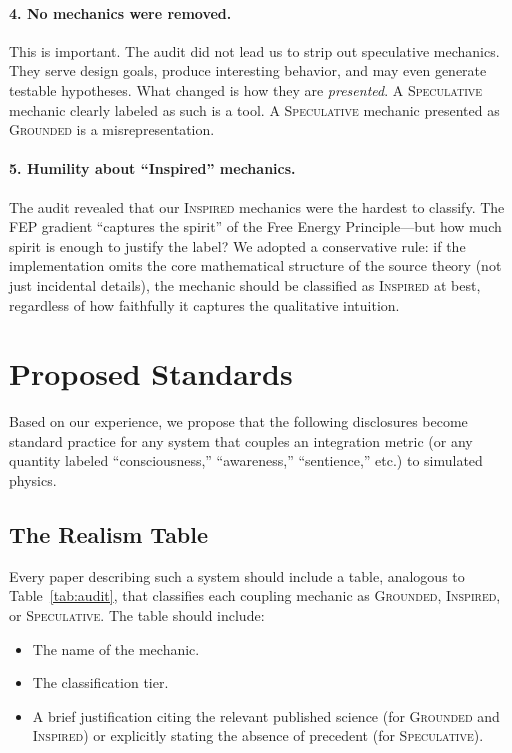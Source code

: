 \documentclass[12pt,a4paper]{article}
\begin{document}
\paragraph{4. No mechanics were removed.}
This is important.  The audit did not lead us to strip out
speculative mechanics.  They serve design goals, produce
interesting behavior, and may even generate testable hypotheses.
What changed is how they are \emph{presented}.  A
\textsc{Speculative} mechanic clearly labeled as such is a tool.
A \textsc{Speculative} mechanic presented as \textsc{Grounded}
is a misrepresentation.

\paragraph{5. Humility about ``Inspired'' mechanics.}
The audit revealed that our \textsc{Inspired} mechanics were
the hardest to classify.  The FEP gradient ``captures the
spirit'' of the Free Energy Principle---but how much spirit is
enough to justify the label?  We adopted a conservative rule:
if the implementation omits the core mathematical structure of
the source theory (not just incidental details), the mechanic
should be classified as \textsc{Inspired} at best, regardless
of how faithfully it captures the qualitative intuition.


\section{Proposed Standards}
\label{sec:standards}

Based on our experience, we propose that the following
disclosures become standard practice for any system that couples
an integration metric (or any quantity labeled ``consciousness,''
``awareness,'' ``sentience,'' etc.) to simulated physics.

\subsection{The Realism Table}

Every paper describing such a system should include a table,
analogous to Table~\ref{tab:audit}, that classifies each
coupling mechanic as \textsc{Grounded}, \textsc{Inspired}, or
\textsc{Speculative}.  The table should include:

\begin{itemize}
  \item The name of the mechanic.
  \item The classification tier.
  \item A brief justification citing the relevant published
    science (for \textsc{Grounded} and \textsc{Inspired}) or
    explicitly stating the absence of precedent (for
    \textsc{Speculative}).
\end{itemize}
\end{document}
